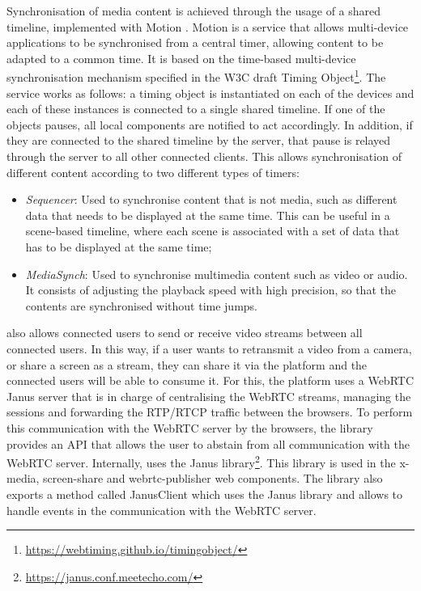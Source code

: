Synchronisation of media content is achieved through the usage of a shared timeline, implemented with Motion \citep{boronat2017hybrid, montagud2018mediasync}. Motion is a service that allows multi-device applications to be synchronised from a central timer, allowing content to be adapted to a common time. It is based on the time-based multi-device synchronisation mechanism specified in the W3C draft Timing Object\footnote{\url{https://webtiming.github.io/timingobject/}}.
The service works as follows: a timing object is instantiated on each of the devices and each of these instances is connected to a single shared timeline. If one of the objects pauses, all local components are notified to act accordingly. In addition, if they are connected to the shared timeline by the server, that pause is relayed through the server to all other connected clients.
This allows synchronisation of different content according to two different types of timers:
\begin{itemize}
    \item \textit{Sequencer}: Used to synchronise content that is not media, such as different data that needs to be displayed at the same time. This can be useful in a scene-based timeline, where each scene is associated with a set of data that has to be displayed at the same time;
    \item \textit{MediaSynch}: Used to synchronise multimedia content such as video or audio. It consists of adjusting the playback speed with high precision, so that the contents are synchronised without time jumps.
\end{itemize}

\ork{} also allows connected users to send or receive video streams between all connected users. In this way, if a user wants to retransmit a video from a camera, or share a screen as a stream, they can share it via the platform and the connected users will be able to consume it. For this, the platform uses a WebRTC Janus server that is in charge of centralising the WebRTC streams, managing the sessions and forwarding the RTP/RTCP traffic between the browsers. To perform this communication with the WebRTC server by the browsers, the library provides an API that allows the user to abstain from all communication with the WebRTC server. Internally, \ork{} uses the Janus library\footnote{\url{https://janus.conf.meetecho.com/}}. This library is used in the x-media, screen-share and webrtc-publisher web components. The library also exports a method called JanusClient which uses the Janus library and allows to handle events in the communication with the WebRTC server.

